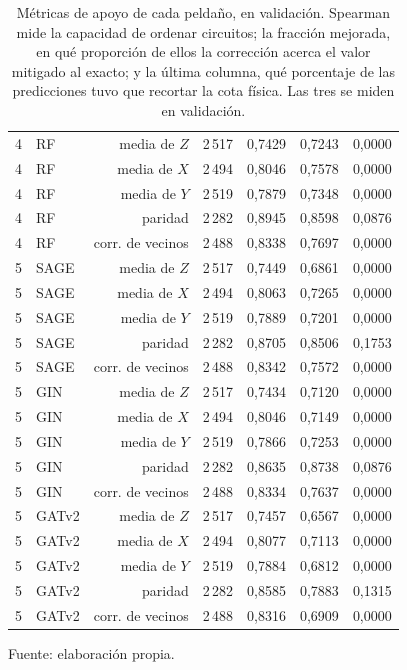 \begin{table}[htbp]
{\begin{tabular}{@{}llrrrrr@{}}
        4 & RF & media de $Z$ & 2\,517 & 0,7429 & 0,7243 & 0,0000 \\
        4 & RF & media de $X$ & 2\,494 & 0,8046 & 0,7578 & 0,0000 \\
        4 & RF & media de $Y$ & 2\,519 & 0,7879 & 0,7348 & 0,0000 \\
        4 & RF & paridad & 2\,282 & 0,8945 & 0,8598 & 0,0876 \\
        4 & RF & corr. de vecinos & 2\,488 & 0,8338 & 0,7697 & 0,0000 \\
        5 & SAGE & media de $Z$ & 2\,517 & 0,7449 & 0,6861 & 0,0000 \\
        5 & SAGE & media de $X$ & 2\,494 & 0,8063 & 0,7265 & 0,0000 \\
        5 & SAGE & media de $Y$ & 2\,519 & 0,7889 & 0,7201 & 0,0000 \\
        5 & SAGE & paridad & 2\,282 & 0,8705 & 0,8506 & 0,1753 \\
        5 & SAGE & corr. de vecinos & 2\,488 & 0,8342 & 0,7572 & 0,0000 \\
        5 & GIN & media de $Z$ & 2\,517 & 0,7434 & 0,7120 & 0,0000 \\
        5 & GIN & media de $X$ & 2\,494 & 0,8046 & 0,7149 & 0,0000 \\
        5 & GIN & media de $Y$ & 2\,519 & 0,7866 & 0,7253 & 0,0000 \\
        5 & GIN & paridad & 2\,282 & 0,8635 & 0,8738 & 0,0876 \\
        5 & GIN & corr. de vecinos & 2\,488 & 0,8334 & 0,7637 & 0,0000 \\
        5 & GATv2 & media de $Z$ & 2\,517 & 0,7457 & 0,6567 & 0,0000 \\
        5 & GATv2 & media de $X$ & 2\,494 & 0,8077 & 0,7113 & 0,0000 \\
        5 & GATv2 & media de $Y$ & 2\,519 & 0,7884 & 0,6812 & 0,0000 \\
        5 & GATv2 & paridad & 2\,282 & 0,8585 & 0,7883 & 0,1315 \\
        5 & GATv2 & corr. de vecinos & 2\,488 & 0,8316 & 0,6909 & 0,0000 \\
        \bottomrule
    \end{tabular}}

    \caption{Métricas de apoyo de cada peldaño, en validación. Spearman mide la capacidad de ordenar circuitos; la fracción mejorada, en qué proporción de ellos la corrección acerca el valor mitigado al exacto; y la última columna, qué porcentaje de las predicciones tuvo que recortar la cota física. Las tres se miden en validación.}
    \label{tab:v2_escalera_apoyo}

    {\footnotesize Fuente: elaboración propia.}
\end{table}
